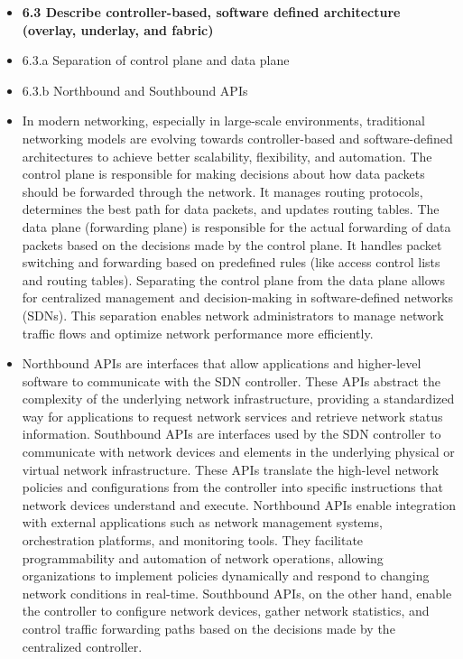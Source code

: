 \documentclass{article}
\begin{document}
\begin{itemize}
  \item \textbf{6.3 Describe controller-based, software defined architecture (overlay, underlay, and fabric)} 
  \item 6.3.a Separation of control plane and data plane
  \item 6.3.b Northbound and Southbound APIs
  	\item[] In modern networking, especially in large-scale environments, traditional networking models are evolving towards controller-based and software-defined architectures to achieve better scalability, flexibility, and automation. The control plane is responsible for making decisions about how data packets should be forwarded through the network. It manages routing protocols, determines the best path for data packets, and updates routing tables. The data plane (forwarding plane) is responsible for the actual forwarding of data packets based on the decisions made by the control plane. It handles packet switching and forwarding based on predefined rules (like access control lists and routing tables). Separating the control plane from the data plane allows for centralized management and decision-making in software-defined networks (SDNs). This separation enables network administrators to manage network traffic flows and optimize network performance more efficiently.
	\item[] Northbound APIs are interfaces that allow applications and higher-level software to communicate with the SDN controller. These APIs abstract the complexity of the underlying network infrastructure, providing a standardized way for applications to request network services and retrieve network status information. Southbound APIs are interfaces used by the SDN controller to communicate with network devices and elements in the underlying physical or virtual network infrastructure. These APIs translate the high-level network policies and configurations from the controller into specific instructions that network devices understand and execute. Northbound APIs enable integration with external applications such as network management systems, orchestration platforms, and monitoring tools. They facilitate programmability and automation of network operations, allowing organizations to implement policies dynamically and respond to changing network conditions in real-time. Southbound APIs, on the other hand, enable the controller to configure network devices, gather network statistics, and control traffic forwarding paths based on the decisions made by the centralized controller.

\end{itemize}
\end{document}
